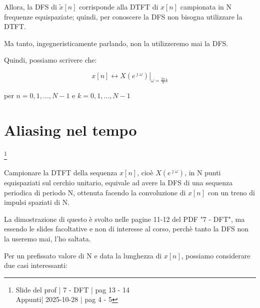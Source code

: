 Allora, la DFS di $\tilde{x} \left[ n\right]$ corrisponde alla DTFT di $x \left[ n\right]$ campionata in N frequenze equispaziate; 
quindi, per conoscere la DFS non bisogna utilizzare la DTFT. \newline 

\begin{tcolorbox}
    Ma tanto, ingegneristicamente parlando, non la utilizzeremo mai la DFS. 
\end{tcolorbox}

Quindi, possiamo scrivere che: 

{
    \Large 
    \begin{equation}
        x \left[ n\right]  
        \leftrightarrow 
        \left.
        X \left(e^{\jmath \omega}\right)
        \right|_{\omega = \frac{2 \pi}{N} k}
    \end{equation}
}

per $n = 0, 1, \dots, N-1$ e $k = 0, 1, \dots, N-1$

\newpage 

\section{Aliasing nel tempo} \label{sec: Aliasing nel tempo}

\footnote{ 
    Slide del prof | 7 - DFT | pag 13 - 14\\
    Appunti| 2025-10-28 | pag 4 - 5
}

Campionare la DTFT della sequenza $x \left[ n\right]$, cioè $X \left( e^{\jmath \omega}\right)$, in N punti equispaziati sul cerchio unitario, 
equivale ad avere la DFS di una sequenza periodica di periodo N, ottenuta facendo la convoluzione di $x \left[  n \right]$ con un treno di impulsi spaziati di N. \newline 

\begin{tcolorbox}
    La dimostrazione di questo è svolto nelle pagine 11-12 del PDF "7 - DFT", ma essendo le slides facoltative e non di interesse al corso, perchè tanto la DFS non la useremo mai, l'ho saltata. 
\end{tcolorbox}

Per un prefissato valore di N e data la lunghezza di $x \left[ n\right]$, possiamo considerare due casi interessanti: \newline 

